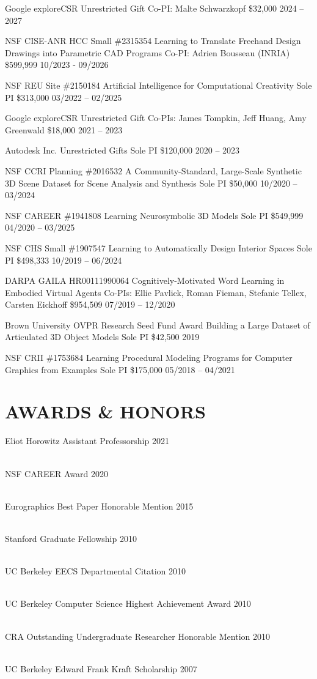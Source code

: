 \documentclass[line,margin]{res}
\begin{document}
\begin{resume}
\funding
{Google exploreCSR}
{Unrestricted Gift}
{Co-PI: Malte Schwarzkopf}
{\$32,000}
{2024 -- 2027}

\funding
{NSF CISE-ANR HCC Small \#2315354}
{Learning to Translate Freehand Design Drawings into Parametric CAD Programs}
{Co-PI: Adrien Bousseau (INRIA)}
{\$599,999}
{10/2023 - 09/2026}

\funding
{NSF REU Site \#2150184}
{Artificial Intelligence for Computational Creativity}
{Sole PI}
{\$313,000}
{03/2022 -- 02/2025}

\funding
{Google exploreCSR}
{Unrestricted Gift}
{Co-PIs: James Tompkin, Jeff Huang, Amy Greenwald}
{\$18,000}
{2021 -- 2023}

\funding
{Autodesk Inc.}
{Unrestricted Gifts}
{Sole PI}
{\$120,000}
{2020 -- 2023}

\funding
{NSF CCRI Planning \#2016532}
{A Community-Standard, Large-Scale Synthetic 3D Scene Dataset for Scene Analysis and Synthesis}
{Sole PI}
{\$50,000}
{10/2020 -- 03/2024}

\funding
{NSF CAREER \#1941808}
{Learning Neurosymbolic 3D Models}
{Sole PI}
{\$549,999}
{04/2020 -- 03/2025}

\funding
{NSF CHS Small \#1907547}
{Learning to Automatically Design Interior Spaces}
{Sole PI}
{\$498,333}
{10/2019 -- 06/2024}

\funding
{DARPA GAILA HR00111990064}
{Cognitively-Motivated Word Learning in Embodied Virtual Agents}
{Co-PIs: Ellie Pavlick, Roman Fieman, Stefanie Tellex, Carsten Eickhoff}
{\$954,509}
{07/2019 -- 12/2020}

\funding
{Brown University OVPR Research Seed Fund Award}
{Building a Large Dataset of Articulated 3D Object Models}
{Sole PI}
{\$42,500}
{2019}

\funding
{NSF CRII \#1753684}
{Learning Procedural Modeling Programs for Computer Graphics from Examples}
{Sole PI}
{\$175,000}
{05/2018 -- 04/2021}


\section{AWARDS \& HONORS}

\newcommand{\award}[2] {
	#1 \hfill #2
}

\award
{Eliot Horowitz Assistant Professorship}
{2021}
\\
\award
{NSF CAREER Award}
{2020}
\\
\award
{Eurographics Best Paper Honorable Mention}
{2015}
\\
\award
{Stanford Graduate Fellowship}
{2010}
\\
\award
{UC Berkeley EECS Departmental Citation}
{2010}
\\
\award
{UC Berkeley Computer Science Highest Achievement Award}
{2010}
\\
\award
{CRA Outstanding Undergraduate Researcher Honorable Mention}
{2010}
\\
\award
{UC Berkeley Edward Frank Kraft Scholarship}
{2007}


\end{resume}
\end{document}
